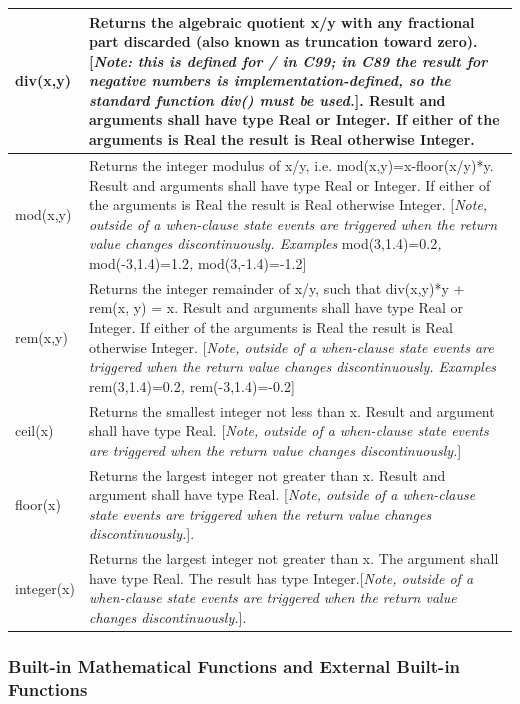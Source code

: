 \documentclass[10pt,a4paper]{report}
\def\doublelabel#1{\label{#1}}
\begin{document}
\begin{longtable}{|p{2cm}|p{12cm}|} \hline
\endhead
div(x,y) & Returns the algebraic quotient x/y with any fractional part
discarded (also known as truncation toward zero). {[}\emph{Note: this is
defined for / in C99; in C89 the result for negative numbers is
implementation-defined, so the standard function div() must be
used.}{]}. Result and arguments shall have type Real or Integer. If
either of the arguments is Real the result is Real otherwise
Integer.\\ \hline
mod(x,y) & Returns the integer modulus of x/y, i.e.
mod(x,y)=x-floor(x/y)*y. Result and arguments shall have type Real or
Integer. If either of the arguments is Real the result is Real otherwise
Integer. {[}\emph{Note, outside of a when-clause state events are
triggered when the return value changes discontinuously. Examples}
mod(3,1.4)=0.2\emph{,} mod(-3,1.4)=1.2\emph{,}
mod(3,-1.4)=-1.2{]}\\ \hline
rem(x,y) & Returns the integer remainder of x/y, such that div(x,y)*y +
rem(x, y) = x. Result and arguments shall have type Real or Integer. If
either of the arguments is Real the result is Real otherwise Integer.
{[}\emph{Note, outside of a when-clause state events are triggered when
the return value changes discontinuously. Examples}
rem(3,1.4)=0.2\emph{,} rem(-3,1.4)=-0.2{]}\\ \hline
ceil(x) & Returns the smallest integer not less than x. Result and
argument shall have type Real. {[}\emph{Note, outside of a when-clause
state events are triggered when the return value changes
discontinuously.}{]}\\ \hline
floor(x) & Returns the largest integer not greater than x. Result and
argument shall have type Real. {[}\emph{Note, outside of a when-clause
state events are triggered when the return value changes
discontinuously.}{]}.\\ \hline
integer(x) & Returns the largest integer not greater
than x. The argument shall have type Real. The result has type
Integer.{[}\emph{Note, outside of a when-clause state
events are triggered when the return value changes
discontinuously.}{]}.\\ \hline
\end{longtable}

\subsubsection{Built-in Mathematical Functions and External Built-in Functions}\doublelabel{built-in-mathematical-functions-and-external-built-in-functions}
\end{document}
